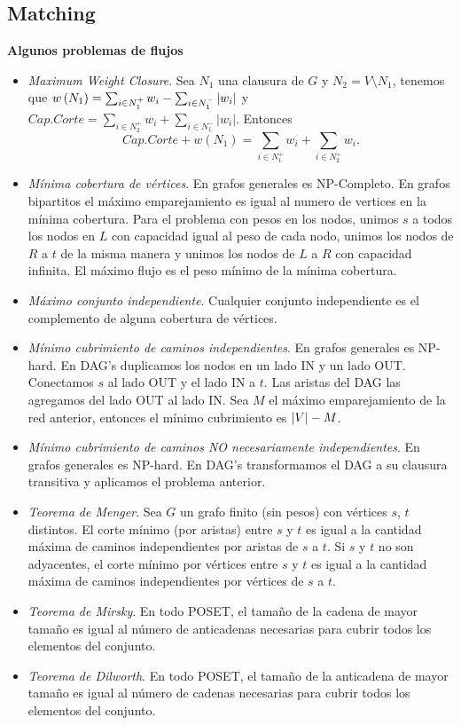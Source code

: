 \subsection{Matching}


\textbf{Algunos problemas de flujos}
\begin{itemize}
    \item \textit{Maximum Weight Closure}. Sea $N_1$ una clausura de $G$ y $N_2 = V \setminus N_1$, tenemos que $w\left( N_1 \right) = \sum_{i \in N_1^+} w_i - \sum_{i \in N_1^-} |w_i|$ y $Cap.Corte = \sum_{i \in N_2^+} w_i + \sum_{i \in N_1^-} |w_i|$. Entonces
    $$Cap.Corte + w(N_1) = \sum_{i \in N_1^+} w_i + \sum_{i \in N_2^+} w_i.$$
    \item \textit{Mínima cobertura de vértices}. En grafos generales es NP-Completo. En grafos bipartitos el máximo emparejamiento es igual al numero de vertices en la mínima cobertura. Para el problema con pesos en los nodos, unimos $s$ a todos los nodos en $L$ con capacidad igual al peso de cada nodo, unimos los nodos de $R$ a $t$ de la misma manera y unimos los nodos de $L$ a $R$ con capacidad infinita. El máximo flujo es el peso mínimo de la mínima cobertura.
    \item \textit{Máximo conjunto independiente}. Cualquier conjunto independiente es el complemento de alguna cobertura de vértices.
    \item \textit{Mínimo cubrimiento de caminos independientes}. En grafos generales es NP-hard. En DAG's duplicamos los nodos en un lado IN y un lado OUT. Conectamos $s$ al lado OUT y el lado IN a $t$. Las aristas del DAG las agregamos del lado OUT al lado IN. Sea $M$ el máximo emparejamiento de la red anterior, entonces el mínimo cubrimiento es $\abs{V} - M$.
    \item \textit{Mínimo cubrimiento de caminos NO necesariamente independientes}. En grafos generales es NP-hard. En DAG's transformamos el DAG a su clausura transitiva y aplicamos el problema anterior.
    \item \textit{Teorema de Menger}. Sea $G$ un grafo finito (sin pesos) con vértices $s$, $t$ distintos. El corte mínimo (por aristas) entre $s$ y $t$ es igual a la cantidad máxima de caminos independientes por aristas de $s$ a $t$. Si $s$ y $t$ no son adyacentes, el corte mínimo por vértices entre $s$ y $t$ es igual a la cantidad máxima de caminos independientes por vértices de $s$ a $t$.
    \item \textit{Teorema de Mirsky}. En todo POSET, el tamaño de la cadena de mayor tamaño es igual al número de anticadenas necesarias para cubrir todos los elementos del conjunto.
    \item \textit{Teorema de Dilworth}. En todo POSET, el tamaño de la anticadena de mayor tamaño es igual al número de cadenas necesarias para cubrir todos los elementos del conjunto.
    \end{itemize}


